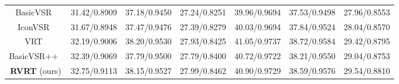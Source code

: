 \documentclass{article}
\newcommand{\R}[1]{\textcolor[rgb]{0.00,0.00,0.00}{#1}}
\newcommand{\B}[1]{\textcolor[rgb]{0.00,0.00,0.00}{#1}}
\newlength \g
\begin{document}
\begin{table*}[!t]
\begin{center}
{\begin{tabular}{c|c|c|c|c|c|c}
                \mbox{BasicVSR}~\cite{chan2021basicvsr}     & 31.42/0.8909                         & 37.18/0.9450                       & 27.24/0.8251                & 39.96/{0.9694}              & 37.53/0.9498                    & 27.96/0.8553                \\
                \mbox{IconVSR}~\cite{chan2021basicvsr}       & {{31.67}/{0.8948}}               & 37.47/0.9476                       & {27.39}/{0.8279}      & {40.03}/{0.9694}         & {37.84}/{0.9524}          & {28.04}/{0.8570}      \\ 
                {VRT}~\cite{liang2022vrt}                        &     {32.19/0.9006}         &   \B{38.20/0.9530}    &    \B{27.93/0.8425}      &    \B{41.05/0.9737}       &   \B{38.72/0.9584}        &  \B{29.42/0.8795}   \\{BasicVSR++}~\cite{chan2021basicvsr++}           & \B{32.39/0.9069}             & {{37.79}/{0.9500}}        & {{27.79}/{0.8400}}      & {{40.72}/{0.9722}}         & {{38.21}/{0.9550}}          & {{29.04}/{0.8753}}      \\ 
               \textbf{RVRT} (ours)                  &     \R{32.75/0.9113}         &   \R{38.15/0.9527}    &    \R{27.99/0.8462}      &    \R{40.90/0.9729}       &   \R{38.59/0.9576}        &  \R{29.54/0.8810}   \\
                \hline
            \end{tabular}}
        \vspace{-0.1cm}
    \end{center}
\end{table*}

\begin{table}[!t]
\scriptsize
\captionsetup{font=small}\center
\caption{Comparison of model size, testing memory and runtime for an LQ input of .}\vspace{2mm}
\label{tab:vsr_runtime}
\begin{center}
\end{center}
\end{table}
\end{document}
